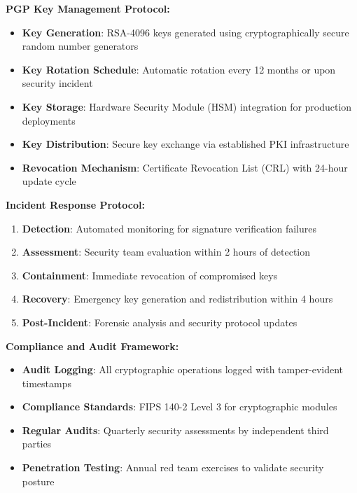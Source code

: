 \documentclass[sigconf,natbib]{acmart}
\begin{document}
\textbf{PGP Key Management Protocol:}
\begin{itemize}
    \item \textbf{Key Generation}: RSA-4096 keys generated using cryptographically secure random number generators
    \item \textbf{Key Rotation Schedule}: Automatic rotation every 12 months or upon security incident
    \item \textbf{Key Storage}: Hardware Security Module (HSM) integration for production deployments
    \item \textbf{Key Distribution}: Secure key exchange via established PKI infrastructure
    \item \textbf{Revocation Mechanism}: Certificate Revocation List (CRL) with 24-hour update cycle
\end{itemize}

\textbf{Incident Response Protocol:}
\begin{enumerate}
    \item \textbf{Detection}: Automated monitoring for signature verification failures
    \item \textbf{Assessment}: Security team evaluation within 2 hours of detection
    \item \textbf{Containment}: Immediate revocation of compromised keys
    \item \textbf{Recovery}: Emergency key generation and redistribution within 4 hours
    \item \textbf{Post-Incident}: Forensic analysis and security protocol updates
\end{enumerate}

\textbf{Compliance and Audit Framework:}
\begin{itemize}
    \item \textbf{Audit Logging}: All cryptographic operations logged with tamper-evident timestamps
    \item \textbf{Compliance Standards}: FIPS 140-2 Level 3 for cryptographic modules
    \item \textbf{Regular Audits}: Quarterly security assessments by independent third parties
    \item \textbf{Penetration Testing}: Annual red team exercises to validate security posture
\end{itemize}
\end{document}
